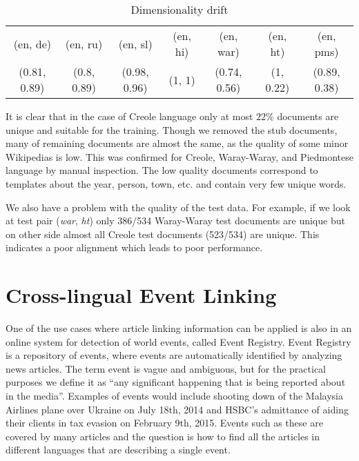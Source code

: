 \documentclass[twoside,11pt]{article}
\begin{document}
{\begin{table}[h]
\caption{Dimensionality drift}
\label{table:rank}
\begin{tabular}{|c|c|c|c|c|c|c|}
\cline{1-7}
(en, de)     &   (en, ru)     &   (en, sl)       &     (en, hi)&   (en, war)      &      (en, ht) &   (en, pms)\\
\cline{1-7}
(0.81, 0.89)   &  (0.8, 0.89)  &   (0.98, 0.96)    &    (1, 1)  &   (0.74, 0.56)  &      (1, 0.22)  &   (0.89, 0.38)\\
\cline{1-7}
\end{tabular}
\end{table}

It is clear that in the case of Creole language only at most $22\%$ documents are unique and suitable for the training. Though we removed the stub documents, many of remaining documents are almost the same, as the quality of some minor Wikipedias is low. This was confirmed for Creole, Waray-Waray, and Piedmontese language by manual inspection. The low quality documents correspond to templates about the year, person, town, etc. and contain very few unique words.

We also have a problem with the quality of the test data. For example, if we look at test pair (\emph{war}, \emph{ht}) only 386/534 Waray-Waray test documents are unique but on other side almost all Creole test documents (523/534) are unique. This indicates a poor alignment which leads to poor performance.
}

\section{Cross-lingual Event Linking}

One of the use cases where article linking information can be applied is also in an online system for detection of world events, called Event Registry\cite{}. Event Registry is a repository of events, where events are automatically identified by analyzing news articles. The term event is vague and ambiguous, but for the practical purposes we define it as ``any significant happening that is being reported about in the media''. Examples of events would include shooting down of the Malaysia Airlines plane over Ukraine on July 18th, 2014 and HSBC's admittance of aiding their clients in tax evasion on February 9th, 2015. Events such as these are covered by many articles and the question is how to find all the articles in different languages that are describing a single event.
\end{document}
